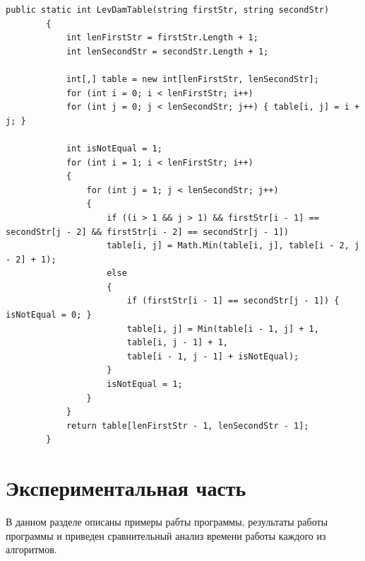 \documentclass[12pt]{report}
\begin{document}
	\begin{lstlisting}[label=sone-code,caption=Функция нахождения расстояния Дамерау-Левенштейна используя матрицу]
		public static int LevDamTable(string firstStr, string secondStr)
		{
			int lenFirstStr = firstStr.Length + 1;
			int lenSecondStr = secondStr.Length + 1;
			
			int[,] table = new int[lenFirstStr, lenSecondStr];
			for (int i = 0; i < lenFirstStr; i++)
			for (int j = 0; j < lenSecondStr; j++) { table[i, j] = i + j; }
			
			int isNotEqual = 1;
			for (int i = 1; i < lenFirstStr; i++)
			{
				for (int j = 1; j < lenSecondStr; j++)
				{
					if ((i > 1 && j > 1) && firstStr[i - 1] == secondStr[j - 2] && firstStr[i - 2] == secondStr[j - 1])
					table[i, j] = Math.Min(table[i, j], table[i - 2, j - 2] + 1);
					else
					{
						if (firstStr[i - 1] == secondStr[j - 1]) { isNotEqual = 0; }
						table[i, j] = Min(table[i - 1, j] + 1,
						table[i, j - 1] + 1,
						table[i - 1, j - 1] + isNotEqual);
					}
					isNotEqual = 1;
				}
			}
			return table[lenFirstStr - 1, lenSecondStr - 1];
		}
	\end{lstlisting}

	\newpage
	\chapter{Экспериментальная часть}
	В данном разделе описаны примеры рабты программы, результаты работы программы и приведен сравнительный анализ времени работы каждого из алгоритмов.
\end{document}
